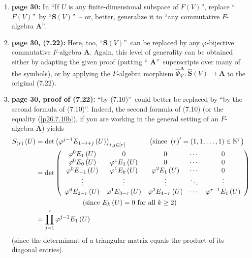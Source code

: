 \documentclass[numbers=enddot,12pt,final,onecolumn,notitlepage]{scrartcl}%
\theoremstyle{definition}
\let\prodnonlimits\prod
\renewcommand{\prod}{\prodnonlimits\limits}
\begin{document}
\begin{enumerate}
\item \textbf{page 30:} In \textquotedblleft If $U$ is any finite-dimensional
subspace of $F\left(  V\right)  $\textquotedblright, replace \textquotedblleft%
$F\left(  V\right)  $\textquotedblright\ by \textquotedblleft$\mathbf{S}%
\left(  V\right)  $\textquotedblright\ -- or, better, generalize it to
\textquotedblleft any commutative $F$-algebra $\mathbf{A}$\textquotedblright.

\item \textbf{page 30, (7.22):} Here, too, \textquotedblleft$\mathbf{S}\left(
V\right)  $\textquotedblright\ can be replaced by any $\varphi$-bijective
commutative $F$-algebra $\mathbf{A}$. Again, this level of generality can be
obtained either by adapting the given proof (putting \textquotedblleft%
$\mathbf{A}$\textquotedblright\ superscripts over many of the symbols), or by
applying the $F$-algebra morphism $\widehat{\Phi}_{V}^{\mathbf{A}%
}:\widehat{\mathbf{S}}\left(  V\right)  \rightarrow\mathbf{A}$ to the original (7.22).

\item \textbf{page 30, proof of (7.22):} \textquotedblleft by
(7.10)\textquotedblright\ could better be replaced by \textquotedblleft by the
second formula of (7.10)\textquotedblright. Indeed, the second formula of
(7.10) (or the equality (\ref{p26.7.10b}), if you are working in the general
setting of an $F$-algebra $\mathbf{A}$) yields%
\begin{align*}
S_{\left(  r\right)  }\left(  U\right)   &  =\det\left(  \varphi
^{j-1}E_{1-i+j}\left(  U\right)  \right)  _{i,j\in\left[  r\right]
}\ \ \ \ \ \ \ \ \ \ \left(  \text{since }\left(  r\right)  ^{\prime}=\left(
1,1,\ldots,1\right)  \in\mathbb{N}^{r}\right)  \\
&  =\det\left(
\begin{array}
[c]{ccccc}%
\varphi^{0}E_{1}\left(  U\right)   & 0 & 0 & \cdots & 0\\
\varphi^{0}E_{0}\left(  U\right)   & \varphi^{1}E_{1}\left(  U\right)   & 0 &
\cdots & 0\\
\varphi^{0}E_{-1}\left(  U\right)   & \varphi^{1}E_{0}\left(  U\right)   &
\varphi^{2}E_{1}\left(  U\right)   & \cdots & 0\\
\vdots & \vdots & \vdots & \ddots & \vdots\\
\varphi^{0}E_{2-r}\left(  U\right)   & \varphi^{1}E_{3-r}\left(  U\right)   &
\varphi^{2}E_{4-r}\left(  U\right)   & \cdots & \varphi^{r-1}E_{1}\left(
U\right)
\end{array}
\right)  \\
&  \ \ \ \ \ \ \ \ \ \ \ \ \ \ \ \ \ \ \ \ \left(  \text{since }E_{k}\left(
U\right)  =0\text{ for all }k\geq2\right)  \\
&  =\prod_{j=1}^{r}\varphi^{j-1}E_{1}\left(  U\right)
\end{align*}
(since the determinant of a triangular matrix equals the product of its
diagonal entries).


\end{enumerate}
\end{document}

